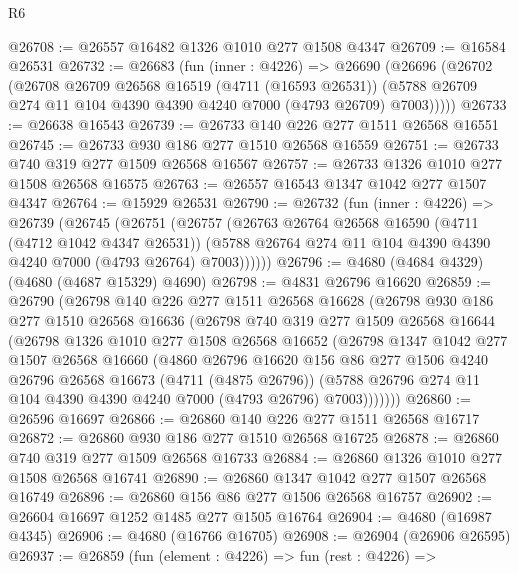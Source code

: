 \begin{lexlean}{R6}
\begin{coremodule}
@26708 := @26557 @16482 @1326 @1010 @277 @1508 @4347
@26709 := @16584 @26531
@26732 := @26683
    (fun (inner : @4226) =>
    @26690
      (@26696
        (@26702
          (@26708
            @26709
            @26568
            @16519
            (@4711 (@16593 @26531))
            (@5788 @26709 @274 @11 @104 @4390 @4390 @4240 @7000 (@4793 @26709) @7003)))))
@26733 := @26638 @16543
@26739 := @26733 @140 @226 @277 @1511 @26568 @16551
@26745 := @26733 @930 @186 @277 @1510 @26568 @16559
@26751 := @26733 @740 @319 @277 @1509 @26568 @16567
@26757 := @26733 @1326 @1010 @277 @1508 @26568 @16575
@26763 := @26557 @16543 @1347 @1042 @277 @1507 @4347
@26764 := @15929 @26531
@26790 := @26732
    (fun (inner : @4226) =>
    @26739
      (@26745
        (@26751
          (@26757
            (@26763
              @26764
              @26568
              @16590
              (@4711 (@4712 @1042 @4347 @26531))
              (@5788 @26764 @274 @11 @104 @4390 @4390 @4240 @7000 (@4793 @26764) @7003))))))
@26796 := @4680 (@4684 @4329) (@4680 (@4687 @15329) @4690)
@26798 := @4831 @26796 @16620
@26859 := @26790
    (@26798
      @140
      @226
      @277
      @1511
      @26568
      @16628
      (@26798
        @930
        @186
        @277
        @1510
        @26568
        @16636
        (@26798
          @740
          @319
          @277
          @1509
          @26568
          @16644
          (@26798
            @1326
            @1010
            @277
            @1508
            @26568
            @16652
            (@26798
              @1347
              @1042
              @277
              @1507
              @26568
              @16660
              (@4860
                @26796
                @16620
                @156
                @86
                @277
                @1506
                @4240
                @26796
                @26568
                @16673
                (@4711 (@4875 @26796))
                (@5788 @26796 @274 @11 @104 @4390 @4390 @4240 @7000 (@4793 @26796) @7003)))))))
@26860 := @26596 @16697
@26866 := @26860 @140 @226 @277 @1511 @26568 @16717
@26872 := @26860 @930 @186 @277 @1510 @26568 @16725
@26878 := @26860 @740 @319 @277 @1509 @26568 @16733
@26884 := @26860 @1326 @1010 @277 @1508 @26568 @16741
@26890 := @26860 @1347 @1042 @277 @1507 @26568 @16749
@26896 := @26860 @156 @86 @277 @1506 @26568 @16757
@26902 := @26604 @16697 @1252 @1485 @277 @1505 @16764
@26904 := @4680 (@16987 @4345)
@26906 := @4680 (@16766 @16705)
@26908 := @26904 (@26906 @26595)
@26937 := @26859
    (fun (element : @4226) =>
    fun (rest : @4226) =>

\end{coremodule}
\end{lexlean}
